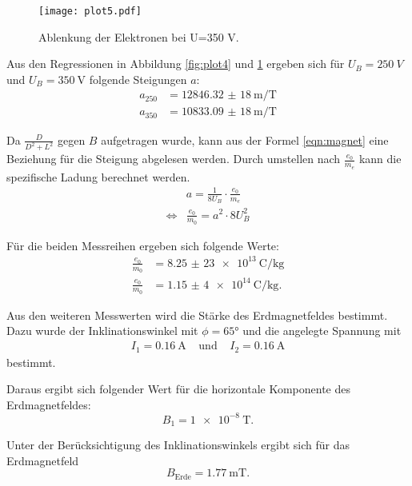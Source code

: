 \begin{figure}
  \centering
  \texttt{[image: plot5.pdf]}
  \caption{Ablenkung der Elektronen bei U=350\; V.}
  \label{fig:plot5}
\end{figure}

Aus den Regressionen in Abbildung \ref{fig:plot4} und \ref{fig:plot5}
ergeben sich für $U_{B}=\SI{250}{V}$ und $U_{B}=\SI{350}{\V}$ folgende Steigungen $a$:
\begin{align*}
  a_{\text{250}}&=\SI{12846,32(18)}{\m\per\tesla}\\
  a_{\text{350}}&=\SI{10833,09(18)}{\m\per\tesla}
\end{align*}

Da $\frac{D}{D^{2}+L^{2}} $ gegen $B$ aufgetragen wurde, kann aus der Formel \ref{eqn:magnet} eine Beziehung für
die Steigung abgelesen werden. Durch umstellen nach $\frac{e_0}{m_e}$ kann die
spezifische Ladung berechnet werden.
\begin{align}
  &a=\frac{1}{8U_{B}}\cdot\frac{e_0}{m_e}\\
  \iff &\frac{e_0}{m_0}=a^{2}\cdot 8 U_{B}^2
\end{align}

Für die beiden Messreihen ergeben sich folgende Werte:
\begin{align*}
  \frac{e_0}{m_0}&=\SI{8,25(23)e+13}{\coulomb\per\kg}\\
  \frac{e_0}{m_0}&=\SI{1,15(4)e+14}{\coulomb\per\kg}.
\end{align*}

Aus den weiteren Messwerten wird die Stärke des Erdmagnetfeldes bestimmt. Dazu wurde der
Inklinationswinkel mit $\phi=65°$ und die angelegte Spannung mit
\begin{align*}
  I_1=\SI{0,16}{\A} \;\;\;\;\text{und}\;\;\;\; I_2=\SI{0,16}{\A}
\end{align*}
bestimmt.

Daraus ergibt sich folgender Wert für die horizontale Komponente des Erdmagnetfeldes:
\begin{equation*}
  B_1=\SI{1e-8}{\tesla}.
\end{equation*}


Unter der Berücksichtigung des Inklinationswinkels ergibt sich für das
Erdmagnetfeld
\begin{equation*}
  B_\text{Erde}=\SI{1,77}{\milli\tesla}.
\end{equation*}
